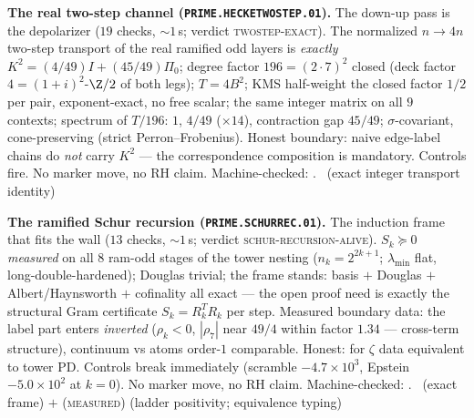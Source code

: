 \par\smallskip\noindent\textbf{The real two-step channel
(\texttt{PRIME.HECKETWOSTEP.01}).}
The down-up pass is the depolarizer ($19$ checks, ${\sim}1$\,s;
verdict \textsc{twostep-exact}).  The normalized $n\to4n$ two-step
transport of the real ramified odd layers is \emph{exactly}
$K^2=(4/49)I+(45/49)\Pi_0$; degree factor $196=(2\cdot7)^2$ closed
(deck factor $4=(1+i)^2$-$\Z/2$ of both legs); $T=4B^2$; KMS
half-weight the closed factor $1/2$ per pair, exponent-exact, no
free scalar; the same integer matrix on all $9$ contexts; spectrum
of $T/196$: $1$, $4/49$ ($\times14$), contraction gap $45/49$;
$\sigma$-covariant, cone-preserving (strict Perron--Frobenius).
Honest boundary: naive edge-label chains do \emph{not} carry $K^2$
--- the correspondence composition is mandatory.  Controls fire.
No marker move, no RH claim.
Machine-checked: .
\mE\ (exact integer transport identity)
\par\smallskip


\par\smallskip\noindent\textbf{The ramified Schur recursion
(\texttt{PRIME.SCHURREC.01}).}
The induction frame that fits the wall ($13$ checks, ${\sim}1$\,s;
verdict \textsc{schur-recursion-alive}).  $S_k\succeq0$
\emph{measured} on all $8$ ram-odd stages of the tower nesting
($n_k=2^{2k+1}$; $\lambda_{\min}$ flat, long-double-hardened);
Douglas trivial; the frame stands: basis $+$ Douglas $+$
Albert/Haynsworth $+$ cofinality all exact --- the open proof need
is exactly the structural Gram certificate $S_k=R_k^TR_k$ per step.
Measured boundary data: the label part enters \emph{inverted}
($\rho_k<0$, $|\rho_7|$ near $49/4$ within factor $1.34$ ---
cross-term structure), continuum vs atoms order-$1$ comparable.
Honest: for $\zeta$ data equivalent to tower PD.  Controls break
immediately (scramble $-4.7\times10^3$, Epstein
$-5.0\times10^2$ at $k=0$).  No marker move, no RH claim.
Machine-checked: .
\mE\ (exact frame) $+$ (\textsc{measured}) (ladder positivity;
equivalence typing)
\par\smallskip


